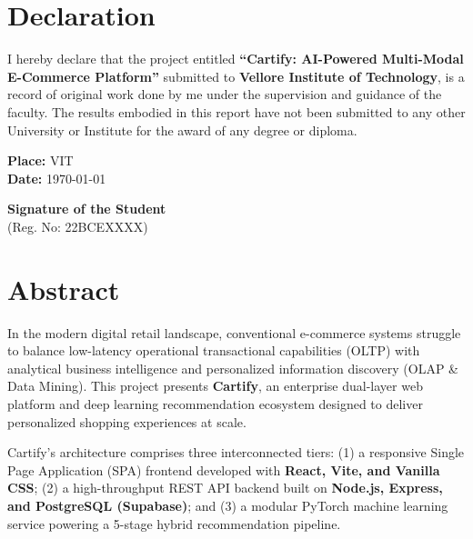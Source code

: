 \documentclass[12pt,a4paper,oneside]{report}
\begin{document}
\chapter*{Declaration}
I hereby declare that the project entitled \textbf{“Cartify: AI-Powered Multi-Modal E-Commerce Platform”} submitted to \textbf{Vellore Institute of Technology}, is a record of original work done by me under the supervision and guidance of the faculty. The results embodied in this report have not been submitted to any other University or Institute for the award of any degree or diploma.

\vspace{2cm}
\noindent
\begin{minipage}[t]{0.5\textwidth}
    \textbf{Place:} VIT\\
    \textbf{Date:} \today
\end{minipage}%
\begin{minipage}[t]{0.5\textwidth}
    \begin{flushright}
        \textbf{Signature of the Student}\\
        (Reg. No: 22BCEXXXX)
    \end{flushright}
\end{minipage}

\newpage

\chapter*{Abstract}
In the modern digital retail landscape, conventional e-commerce systems struggle to balance low-latency operational transactional capabilities (OLTP) with analytical business intelligence and personalized information discovery (OLAP \& Data Mining). This project presents \textbf{Cartify}, an enterprise dual-layer web platform and deep learning recommendation ecosystem designed to deliver personalized shopping experiences at scale.

Cartify's architecture comprises three interconnected tiers: (1) a responsive Single Page Application (SPA) frontend developed with \textbf{React, Vite, and Vanilla CSS}; (2) a high-throughput REST API backend built on \textbf{Node.js, Express, and PostgreSQL (Supabase)}; and (3) a modular PyTorch machine learning service powering a 5-stage hybrid recommendation pipeline. 
\end{document}
